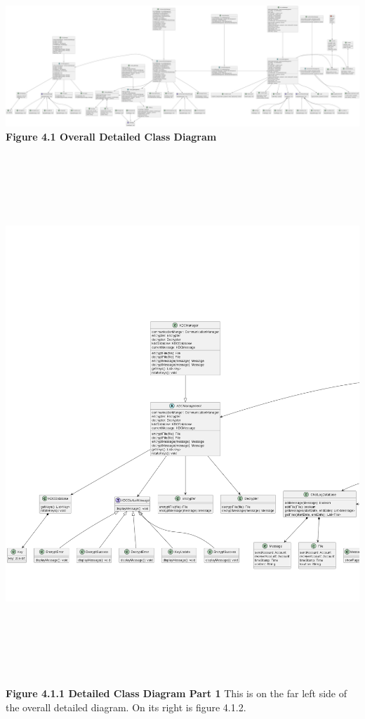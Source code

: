 \documentclass[]{article}
\begin{document}
\begin{center}
	\includegraphics[width=\textwidth]{../images/ClassDiagram/FullClass.png}
	\textbf{Figure 4.1 Overall Detailed Class Diagram}
	\includegraphics[width=\textwidth,height=8in]{../images/ClassDiagram/left.png}
	\textbf{Figure 4.1.1 Detailed Class Diagram Part 1}
	\newline This is on the far left side of the overall detailed diagram. On its right is figure 4.1.2.

\end{center}
\end{document}
